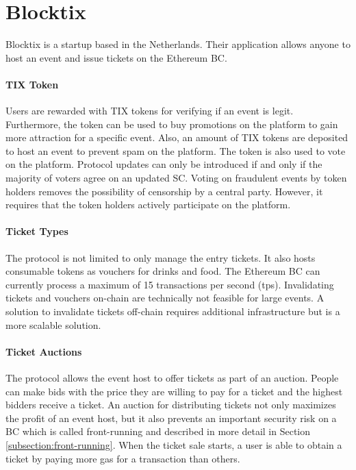 
\section{Blocktix}\label{section:blocktix}

Blocktix \cite{blocktix-whitepaper} is a startup based in the Netherlands. Their application allows anyone to host an event and issue tickets on the Ethereum BC. 

\paragraph{TIX Token}
Users are rewarded with TIX tokens for verifying if an event is legit. Furthermore, the token can be used to buy promotions on the platform to gain more attraction for a specific event. Also, an amount of TIX tokens are deposited to host an event to prevent spam on the platform. The token is also used to vote on the platform. Protocol updates can only be introduced if and only if the majority of voters agree on an updated SC. 
Voting on fraudulent events by token holders removes the possibility of censorship by a central party. However, it requires that the token holders actively participate on the platform. 

\paragraph{Ticket Types}
The protocol is not limited to only manage the entry tickets. It also hosts consumable tokens as vouchers for drinks and food. 
The Ethereum BC can currently process a maximum of 15 transactions per second (tps). Invalidating tickets and vouchers on-chain are technically not feasible for large events. A solution to invalidate tickets off-chain requires additional infrastructure but is a more scalable solution.

\paragraph{Ticket Auctions}
The protocol allows the event host to offer tickets as part of an auction. People can make bids with the price they are willing to pay for a ticket and the highest bidders receive a ticket. 
An auction for distributing tickets not only maximizes the profit of an event host, but it also prevents an important security risk on a BC which is called front-running and described in more detail in Section \ref{subsection:front-running}. When the ticket sale starts, a user is able to obtain a ticket by paying more gas for a transaction than others. 

